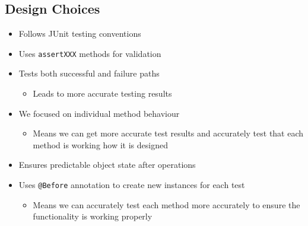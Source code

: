 \documentclass{article}
\begin{document}
\subsection{Design Choices}
\begin{itemize}
    \item Follows JUnit testing conventions
    \item Uses \texttt{assertXXX} methods for validation
    \item Tests both successful and failure paths
          \begin{itemize}
              \item Leads to more accurate testing results
          \end{itemize}
    \item We focused on individual method behaviour
          \begin{itemize}
              \item Means we can get more accurate test results and accurately test that each method is working how it is designed
          \end{itemize}
    \item Ensures predictable object state after operations
    \item Uses \texttt{@Before} annotation to create new instances for each test
          \begin{itemize}
              \item Means we can accurately test each method more accurately to ensure the functionality is working properly
          \end{itemize}
\end{itemize}
\end{document}
